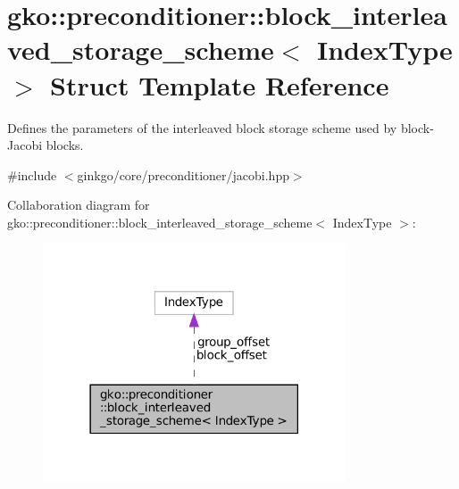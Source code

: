 \hypertarget{structgko_1_1preconditioner_1_1block__interleaved__storage__scheme}{}\section{gko\+:\+:preconditioner\+:\+:block\+\_\+interleaved\+\_\+storage\+\_\+scheme$<$ Index\+Type $>$ Struct Template Reference}
\label{structgko_1_1preconditioner_1_1block__interleaved__storage__scheme}


Defines the parameters of the interleaved block storage scheme used by block-\/\+Jacobi blocks.  




{\ttfamily \#include $<$ginkgo/core/preconditioner/jacobi.\+hpp$>$}



Collaboration diagram for gko\+:\+:preconditioner\+:\+:block\+\_\+interleaved\+\_\+storage\+\_\+scheme$<$ Index\+Type $>$\+:
\nopagebreak
\begin{figure}[H]
\begin{center}
\leavevmode
\includegraphics[width=254pt]{structgko_1_1preconditioner_1_1block__interleaved__storage__scheme__coll__graph}
\end{center}
\end{figure}
